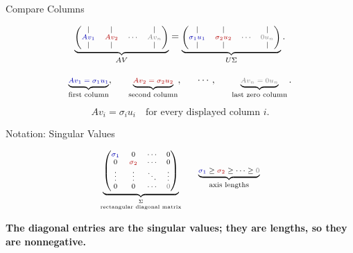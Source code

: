 \documentclass[10pt]{beamer}
\theoremstyle{definition}
\newcommand{\x}[1]{\alert{\textbf{#1}}}
\newcommand{\rd}[1]{{\color{red!70!black}#1}}
\newcommand{\bl}[1]{{\color{blue!70!black}#1}}
\newcommand{\gry}[1]{{\color{gray}#1}}
\newcommand{\Sigdisplay}{\begin{pmatrix}\bl{\sigma_1}&0&\cdots&0\\ 0&\rd{\sigma_2}&\cdots&0\\ \vdots&\vdots&\ddots&\vdots\\ 0&0&\cdots&\gry{0}\end{pmatrix}}
\begin{document}
\begin{frame}[shrink=8]{Compare Columns}

\[
\scriptsize
\underbrace{
\begin{pmatrix}
|&|& &|\\
\bl{Av_1}&\rd{Av_2}&\cdots&\gry{Av_n}\\
|&|& &|
\end{pmatrix}}_{AV}
=
\underbrace{
\begin{pmatrix}
|&|& &|\\
\bl{\sigma_1u_1}&\rd{\sigma_2u_2}&\cdots&\gry{0u_n}\\
|&|& &|
\end{pmatrix}}_{U\Sigma}.
\]

\vfill

\[
\scriptsize
\underbrace{\bl{Av_1=\sigma_1u_1}}_{\text{first column}},
\qquad
\underbrace{\rd{Av_2=\sigma_2u_2}}_{\text{second column}},
\qquad
\cdots,
\qquad
\underbrace{\gry{Av_n=0u_n}}_{\text{last zero column}}.
\]

\vfill

\[
\boxed{Av_i=\sigma_i u_i\quad\text{for every displayed column }i.}
\]

\end{frame}


\begin{frame}[shrink=8]{Notation: Singular Values}

\[
\scriptsize
\underbrace{\Sigdisplay}_{\substack{\Sigma\\\text{rectangular diagonal matrix}}}
\qquad
\underbrace{\bl{\sigma_1}\ge \rd{\sigma_2}\ge\cdots\ge \gry{0}}_{\text{axis lengths}}
\]

\vfill

\begin{center}
\x{The diagonal entries are the singular values; they are lengths, so they are nonnegative.}
\end{center}

\end{frame}
\end{document}
